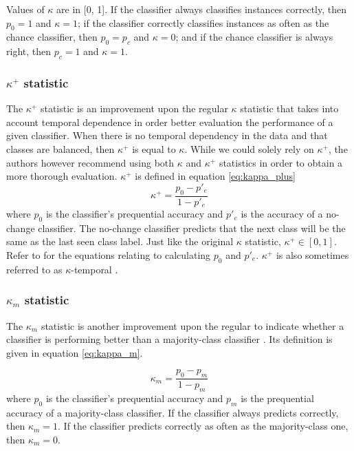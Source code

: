 Values of $\kappa$ are in [0, 1]. If the classifier always classifies instances correctly, then $p_0=1$ and $\kappa=1$; if the classifier correctly classifies instances as often as the chance classifier, then $p_0 = p_c$ and $\kappa=0$; and if the chance classifier is always right, then $p_c=1$ and $\kappa=1$.

\subsubsection{$\kappa^+$ statistic}
The $\kappa^+$ statistic is an improvement upon the regular $\kappa$ statistic that takes into account temporal dependence in order better evaluation the performance of a given classifier. When there is no temporal dependency in the data and that classes are balanced, then $\kappa^+$ is equal to $\kappa$. While we could solely rely on $\kappa^+$, the authors however recommend using both $\kappa$ and $\kappa^+$ statistics in order to obtain a more thorough evaluation.
$\kappa^+$ is defined in equation \ref{eq:kappa_plus}
\begin{equation}
\label{eq:kappa_plus}
\kappa^+=\frac{p_0-p'_e}{1-p'_e}
\end{equation}where $p_0$ is the classifier's prequential accuracy and $p'_e$ is the accuracy of a no-change classifier. The no-change classifier predicts that the next class will be the same as the last seen class label. Just like the original $\kappa$ statistic, $\kappa^+\in [0, 1]$. Refer to \cite{DBLP:conf/pkdd/2013-1} for the equations relating to calculating $p_0$ and $p'_e$. $\kappa^+$ is also sometimes referred to as $\kappa$-temporal \cite{vzliobaite2015evaluation}.

\subsubsection{$\kappa_m$ statistic}
The $\kappa_m$ statistic is another improvement upon the regular to indicate whether a classifier is performing better than a majority-class classifier \cite{bifet2015efficient}. Its definition is given in equation \ref{eq:kappa_m}.

\begin{equation}
    \label{eq:kappa_m}
    \kappa_m = \frac{p_0-p_m}{1-p_m}
\end{equation}where $p_0$ is the classifier's prequential accuracy and $p_m$ is the prequential accuracy of a majority-class classifier. If the classifier always predicts correctly, then $\kappa_m=1$. If the classifier predicts correctly as often as the majority-class one, then $\kappa_m=0$.

